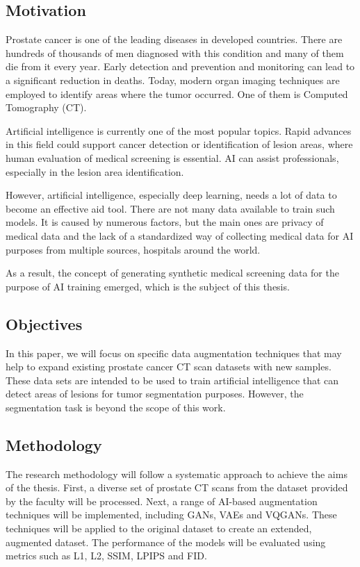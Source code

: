 \subsection{Motivation}
Prostate cancer is one of the leading diseases in developed countries. There are hundreds of thousands of men diagnosed with this condition and many of them die from it every year. Early detection and prevention and monitoring can lead to a significant reduction in deaths. Today, modern organ imaging techniques are employed to identify areas where the tumor occurred. One of them is Computed Tomography (CT). 

Artificial intelligence is currently one of the most popular topics. Rapid advances in this field could support cancer detection or identification of lesion areas, where human evaluation of medical screening is essential. AI can assist professionals, especially in the lesion area identification.

However, artificial intelligence, especially deep learning, needs a lot of data to become an effective aid tool. There are not many data available to train such models. It is caused by numerous factors, but the main ones are privacy of medical data and the lack of a standardized way of collecting medical data for AI purposes from multiple sources, hospitals around the world.

As a result, the concept of generating synthetic medical screening data for the purpose of AI training emerged, which is the subject of this thesis. 

\subsection{Objectives}
In this paper, we will focus on specific data augmentation techniques that may help to expand existing prostate cancer CT scan datasets with new samples. These data sets are intended to be used to train artificial intelligence that can detect areas of lesions for tumor segmentation purposes. However, the segmentation task is beyond the scope of this work. 
\subsection{Methodology}
The research methodology will follow a systematic approach to achieve the aims of the thesis. First, a diverse set of prostate CT scans from the dataset provided by the faculty will be processed. Next, a range of AI-based augmentation techniques will be implemented, including GANs, VAEs and VQGANs. These techniques will be applied to the original dataset to create an extended, augmented dataset. The performance of the models will be evaluated using metrics such as L1, L2, SSIM, LPIPS and FID.
